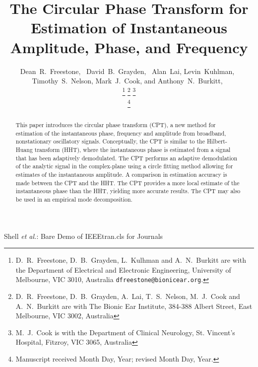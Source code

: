 \documentclass[11pt,draftcls,onecolumn]{IEEEtran}
\begin{document}
\title{The Circular Phase Transform for Estimation of Instantaneous Amplitude, Phase, and Frequency}

\author{Dean~R.~Freestone,~
		David~B.~Grayden,~
        Alan~Lai,
        Levin~Kuhlman,~
        Timothy~S.~Nelson,
        Mark~J.~Cook,
        and Anthony~N.~Burkitt,~
        

\thanks{D.\ R.\ Freestone, D.\ B.\ Grayden, L.\ Kulhman and A.\ N.\ Burkitt are with the Department
of Electrical and Electronic Engineering, University of Melbourne, VIC 3010, Australia {\tt\small dfreestone@bionicear.org}.}  %
\thanks{D.\ R.\ Freestone, D.\ B.\ Grayden, A.\ Lai, T.\ S.\ Nelson, M.\ J.\ Cook and A.\ N.\ Burkitt are with The Bionic Ear Institute, 384-388 Albert Street, East Melbourne, VIC 3002, Australia}
\thanks{M.\ J.\ Cook is with the Department of Clinical Neurology, St. Vincent's Hospital, Fitzroy, VIC 3065, Australia}

\thanks{Manuscript received Month Day, Year; revised Month Day, Year.}}


%
{Shell \MakeLowercase{\textit{et al.}}: Bare Demo of IEEEtran.cls for Journals}

\maketitle

\begin{abstract}
This paper introduces the circular phase transform (CPT), a new method for estimation of the instantaneous phase, frequency and amplitude from broadband, nonstationary oscillatory signals. Conceptually, the CPT is similar to the Hilbert-Huang transform (HHT), where the instantaneous phase is estimated from a signal that has been adaptively demodulated. The CPT performs an adaptive demodulation of the analytic signal in the complex-plane using a circle fitting method allowing for estimates of the instantaneous amplitude. A comparison in estimation accuracy is made between the CPT and the HHT. The CPT provides a more local estimate of the instantaneous phase than the HHT, yielding more accurate results. The CPT may also be used in an empirical mode decomposition.
\end{abstract}
\end{document}
